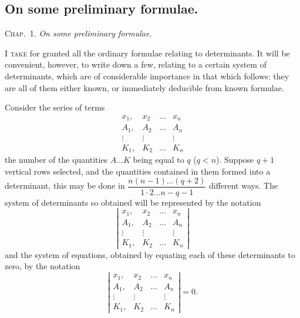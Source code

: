 \documentclass[11pt,a4paper]{article}
\theoremstyle{plain}
\theoremstyle{definition}
\theoremstyle{remark}
\begin{document}
\subsection{On some preliminary formulae.}

\textsc{Chap.\ 1.} \textit{On some preliminary formulae.}

\textsc{I take} for granted all the ordinary formulae relating to determinants. It will be
convenient, however, to write down a few, relating to a certain system of determinants,
which are of considerable importance in that which follows: they are all of them
either known, or immediately deducible from known formulae.

Consider the series of terms
\[
\begin{array}{cccc}
x_1, & x_2 & \ldots & x_n \\
A_1, & A_2 & \ldots & A_n \\
\vdots & \vdots & & \vdots \\
K_1, & K_2 & \ldots & K_n
\end{array}
\tag{1}
\]
the number of the quantities $A \ldots K$ being equal to $q$ ($q < n$). Suppose $q+1$
vertical rows selected, and the quantities contained in them formed into a determinant,
this may be done in $\dfrac{n(n-1) \ldots (q+2)}{1 \cdot 2 \ldots n-q-1}$ different ways. The system of determinants
so obtained will be represented by the notation
\[
\left|
\begin{array}{cccc}
x_1, & x_2 & \ldots & x_n \\
A_1, & A_2 & \ldots & A_n \\
\vdots & \vdots & & \vdots \\
K_1, & K_2 & \ldots & K_n
\end{array}
\right|
\tag{2}
\]
and the system of equations, obtained by equating each of these determinants to zero,
by the notation
\[
\left|
\begin{array}{cccc}
x_1, & x_2 & \ldots & x_n \\
A_1, & A_2 & \ldots & A_n \\
\vdots & \vdots & & \vdots \\
K_1, & K_2 & \ldots & K_n
\end{array}
\right| = 0
\tag{3}.
\]
\end{document}
